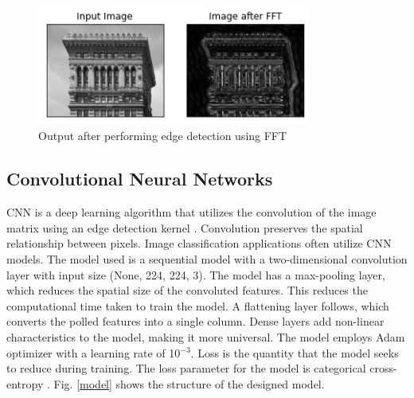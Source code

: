 \documentclass[conference]{IEEEtran}
\begin{document}
\begin{figure}[htpb]
\centerline{\includegraphics[width = 9cm]{fft.png}}
\caption{Output after performing edge detection using FFT}
\label{fft}
\end{figure}

\subsection{Convolutional Neural Networks}
CNN is a deep learning algorithm that utilizes the convolution of the image matrix using an edge detection kernel \cite{b11}. Convolution preserves the spatial relationship between pixels. Image classification applications often utilize CNN models. The model used is a sequential model with a two-dimensional convolution layer with input size (None, 224, 224, 3).  The model has a max-pooling layer, which reduces the spatial size of the convoluted features. This reduces the computational time taken to train the model. A flattening layer follows, which converts the polled features into a single column. Dense layers add non-linear characteristics to the model, making it more universal. The model employs Adam optimizer \cite{b9} with a learning rate of 10$^{-3}$. Loss is the quantity that the model seeks to reduce during training. The loss parameter for the model is categorical cross-entropy \cite{b13}. Fig. \ref{model} shows the structure of the designed model. 
\end{document}
